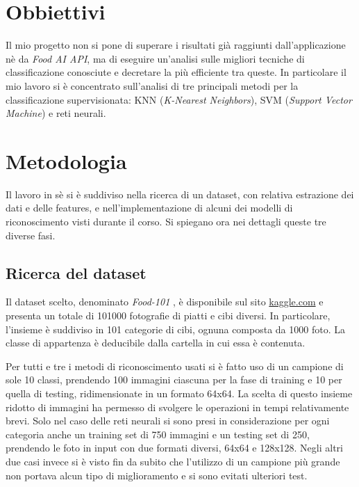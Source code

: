 \documentclass[11pt, a4paper, titlepage]{article}
\begin{document}
\section{Obbiettivi}
Il mio progetto non si pone di superare i risultati già raggiunti dall'applicazione nè da \textit{Food AI API}, ma di eseguire un'analisi sulle migliori tecniche di classificazione conosciute e decretare la più efficiente tra queste. In particolare il mio lavoro si è concentrato sull'analisi di tre principali metodi per la classificazione supervisionata: KNN (\textit{K-Nearest Neighbors}), SVM (\textit{Support Vector Machine}) e reti neurali. 

\pagebreak

\section{Metodologia}
Il lavoro in sè si è suddiviso nella ricerca di un dataset, con relativa estrazione dei dati e delle features, e nell'implementazione di alcuni dei modelli di riconoscimento visti durante il corso. Si spiegano ora nei dettagli queste tre diverse fasi. 

\subsection{Ricerca del dataset}
Il dataset scelto, denominato \emph{Food-101} \cite{food-101}, è disponibile sul sito \href{https://www.kaggle.com/kmader/food41}{kaggle.com} e presenta un totale di 101000 fotografie di piatti e cibi diversi. In particolare, l'insieme è suddiviso in 101 categorie di cibi, ognuna composta da 1000 foto. La classe di appartenza è deducibile dalla cartella in cui essa è contenuta. 

Per tutti e tre i metodi di riconoscimento usati si è fatto uso di un campione di sole 10 classi, prendendo 100 immagini ciascuna per la fase di training e 10 per quella di testing, ridimensionate in un formato 64x64. La scelta di questo insieme ridotto di immagini ha permesso di svolgere le operazioni in tempi relativamente brevi. Solo nel caso delle reti neurali si sono presi in considerazione per ogni categoria anche un training set di 750 immagini e un testing set di 250, prendendo le foto in input con due formati diversi, 64x64 e 128x128. Negli altri due casi invece si è visto fin da subito che l'utilizzo di un campione più grande non portava alcun tipo di miglioramento e si sono evitati ulteriori test. 
\end{document}
